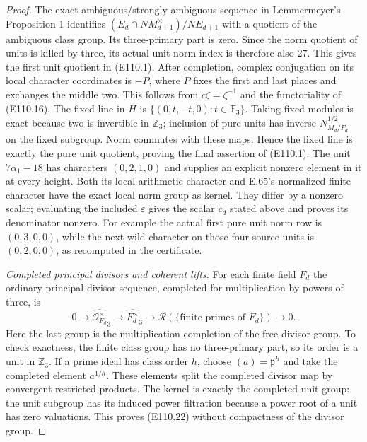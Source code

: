 \begin{proof}
The exact ambiguous/strongly-ambiguous sequence in
Lemmermeyer's Proposition 1 identifies
$(E_d\cap N M_{d+1}^{\times})/N E_{d+1}$ with a quotient of
the ambiguous class group. Its three-primary part is zero.
Since the norm quotient of units is killed by three, its actual
unit-norm index is therefore also $27$.
This gives the first unit quotient in (E110.1).
After completion, complex conjugation on its local character
coordinates is $-\!P$, where $P$ fixes the first and last places
and exchanges the middle two. This follows from
$c\zeta=\zeta^{-1}$ and the functoriality of (E110.16).
The fixed line in $H$ is
$\{(0,t,-t,0):t\in\mathbb F_3\}$.
Taking fixed modules is exact because two is invertible in
$\mathbb Z_3$; inclusion of pure units has inverse
$N_{M_d/F_d}^{1/2}$ on the fixed subgroup.
Norm commutes with these maps. Hence the fixed line is exactly
the pure unit quotient, proving the final assertion of (E110.1).
The unit $7\alpha_1-18$ has characters $(0,2,1,0)$ and supplies
an explicit nonzero element in it at every height.
Both its local arithmetic character and E.65's normalized finite
character have the exact local norm group as kernel. They differ
by a nonzero scalar; evaluating the included $\varepsilon$ gives
the scalar $c_d$ stated above and proves its denominator nonzero.
For example the actual first pure unit norm row is
$(0,3,0,0)$, while the next wild character on those four source
units is $(0,2,0,0)$, as recomputed in the certificate.

\emph{Completed principal divisors and coherent lifts.}
For each finite field $F_d$ the ordinary principal-divisor sequence,
completed for multiplication by powers of three, is
\[
 0\longrightarrow\widehat{\mathcal O_{F_d}^{\times}}_3
  \longrightarrow\widehat{F_d^\times}_3
  \longrightarrow
     \mathcal R(\{\text{finite primes of }F_d\})
  \longrightarrow0 .
 \tag{E110.22}
\]
Here the last group is the multiplication completion of the free
divisor group. To check exactness, the finite class group has no
three-primary part, so its order is a unit in $\mathbb Z_3$.
If a prime ideal has class order $h$, choose
$(a)=\mathfrak p^h$ and take the completed element $a^{1/h}$.
These elements split the completed divisor map by convergent
restricted products. The kernel is exactly the completed unit
group: the unit subgroup has its induced power filtration because
a power root of a unit has zero valuations. This proves (E110.22)
without compactness of the divisor group.


\end{proof}
